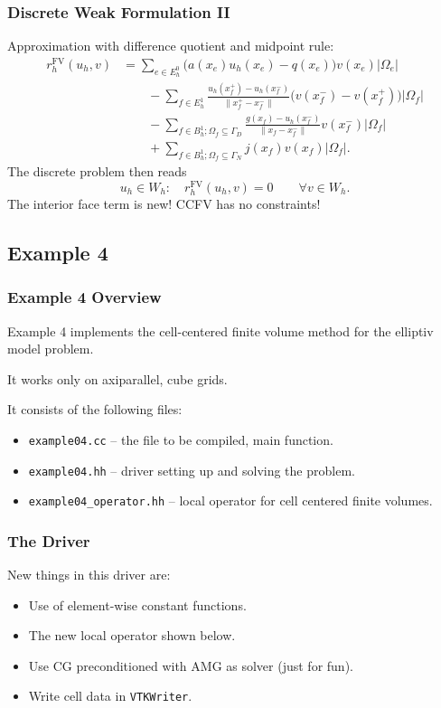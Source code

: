 \begin{frame}
\frametitle{Discrete Weak Formulation II}
Approximation with difference quotient and midpoint rule:
\begin{equation*}
\begin{split}
r_h^{\text{FV}}(u_h,v) & = \sum_{e\in E_h^0} \bigl(a(x_e)u_h(x_e) - q(x_e)\bigr) v(x_e) |\Omega_e|\\
&\qquad - \sum_{f\in E_h^1} \frac{u_h(x_f^+)-u_h(x_f^-)}{\|x_f^+ - x_f^-\|} 
\bigl(v(x_f^-) - v(x_f^+)\bigr) |\Omega_f|\\
&\qquad - \sum_{f\in B_h^1; \Omega_f\subseteq\Gamma_D} \frac{g(x_f)-u_h(x_f^-)}{\|x_f - x_f^-\|} 
v(x_f^-) |\Omega_f|\\
&\qquad + \sum_{f\in B_h^1; \Omega_f\subseteq\Gamma_N} j(x_f) v(x_f) |\Omega_f| .
\end{split}
\end{equation*}
The discrete problem then reads
\begin{equation*}
u_h \in W_h : \quad r_h^{\text{FV}}(u_h,v) = 0 \qquad \forall v \in W_h.
\end{equation*}
The interior face term is new! CCFV has no constraints!
\end{frame}

\subsection{Example 4}

\begin{frame}
\frametitle{Example 4 Overview}
Example 4 implements the cell-centered finite volume method for the elliptiv model problem.

It works only on axiparallel, cube grids.

It consists of the following files:
\begin{itemize}
\item \lstinline{example04.cc} -- the file to be compiled, main function. 
\item \lstinline{example04.hh} -- driver setting up and solving the problem. 
\item \lstinline{example04_operator.hh} -- local operator for cell centered finite volumes.
\end{itemize}
\end{frame}

\begin{frame}
\frametitle{The Driver}
New things in this driver are:
\begin{itemize}
\item Use of element-wise constant functions.
\item The new local operator shown below.
\item Use CG preconditioned with AMG as solver (just for fun).
\item Write cell data in \lstinline{VTKWriter}.
\end{itemize}
\end{frame}

